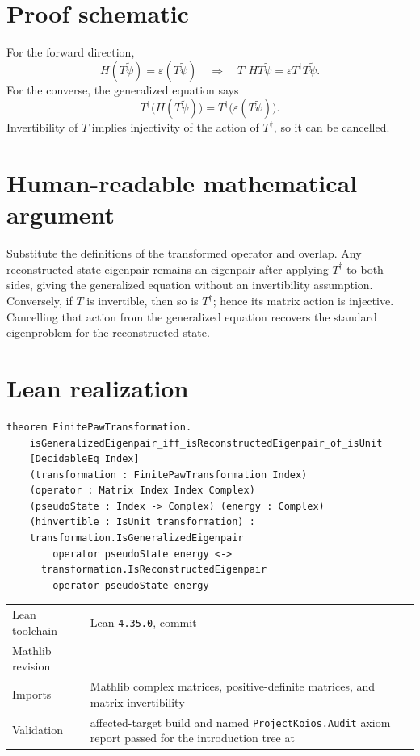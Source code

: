 \section{Proof schematic}
For the forward direction,
\[
 H(T\widetilde\psi)=\varepsilon(T\widetilde\psi)
 \quad\Longrightarrow\quad
 T^\dagger H T\widetilde\psi=\varepsilon T^\dagger T\widetilde\psi.
\]
For the converse, the generalized equation says
\[
 T^\dagger\bigl(H(T\widetilde\psi)\bigr)
 =T^\dagger\bigl(\varepsilon(T\widetilde\psi)\bigr).
\]
Invertibility of $T$ implies injectivity of the action of $T^\dagger$, so it can be cancelled.

\section{Human-readable mathematical argument}
Substitute the definitions of the transformed operator and overlap.  Any reconstructed-state
eigenpair remains an eigenpair after applying $T^\dagger$ to both sides, giving the generalized
equation without an invertibility assumption.  Conversely, if $T$ is invertible, then so is
$T^\dagger$; hence its matrix action is injective.  Cancelling that action from the generalized
equation recovers the standard eigenproblem for the reconstructed state.

\section{Lean realization}
\begin{lstlisting}
theorem FinitePawTransformation.
    isGeneralizedEigenpair_iff_isReconstructedEigenpair_of_isUnit
    [DecidableEq Index]
    (transformation : FinitePawTransformation Index)
    (operator : Matrix Index Index Complex)
    (pseudoState : Index -> Complex) (energy : Complex)
    (hinvertible : IsUnit transformation) :
    transformation.IsGeneralizedEigenpair
        operator pseudoState energy <->
      transformation.IsReconstructedEigenpair
        operator pseudoState energy
\end{lstlisting}
\begin{tabularx}{\textwidth}{@{}lY@{}}
\toprule
Lean toolchain & Lean \texttt{4.35.0}, commit  \\
Mathlib revision &  \\
Imports & Mathlib complex matrices, positive-definite matrices, and matrix invertibility \\
Validation & affected-target build and named \texttt{ProjectKoios.Audit} axiom report passed for the introduction tree at  \\
\bottomrule
\end{tabularx}

